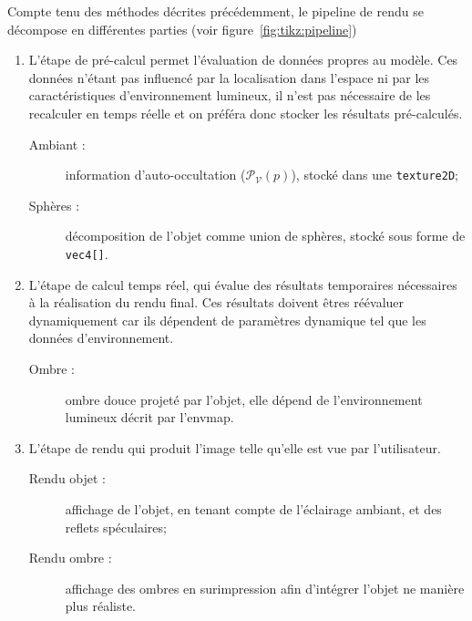 \documentclass[10pt,a4paper,twoside, twocolumn]{report}
\newcommand*{\rootPath}{../}
\begin{document}
\begin{figure*}
	\centering
	
	\caption{Pipeline développé}
	\label{fig:tikz:pipeline}
\end{figure*}

Compte tenu des méthodes décrites précédemment, le pipeline de rendu se décompose en différentes parties (voir figure~\ref{fig:tikz:pipeline})
\begin{enumerate}
	\item L'étape de pré-calcul permet l'évaluation de données propres au modèle. Ces données n'étant pas influencé par la localisation dans l'espace ni par les caractéristiques d'environnement lumineux, il n'est pas nécessaire de les recalculer en temps réelle et on préféra donc stocker les résultats pré-calculés.
		\begin{description}
			\item[Ambiant :] information d'auto-occultation ($\mathcal P_{\mathcal V}(p)$), stocké dans une \texttt{texture2D};
			\item[Sphères :] décomposition de l'objet comme union de sphères, stocké sous forme de \texttt{vec4[]}.
		\end{description}

	\item L'étape de calcul temps réel, qui évalue des résultats temporaires nécessaires à la réalisation du rendu final. Ces résultats doivent êtres réévaluer dynamiquement car ils dépendent de paramètres dynamique tel que les données d'environnement.
		\begin{description}
			\item[Ombre :] ombre douce projeté par l'objet, elle dépend de l'environnement lumineux décrit par l'envmap.
		\end{description}
	
	\item L'étape de rendu qui produit l'image telle qu'elle est vue par l'utilisateur.
		\begin{description}
			\item[Rendu objet :] affichage de l'objet, en tenant compte de l'éclairage ambiant, et des reflets spéculaires;
			\item[Rendu ombre :] affichage des ombres en surimpression afin d'intégrer l'objet ne manière plus réaliste.
		\end{description}
\end{enumerate}

\end{document}
